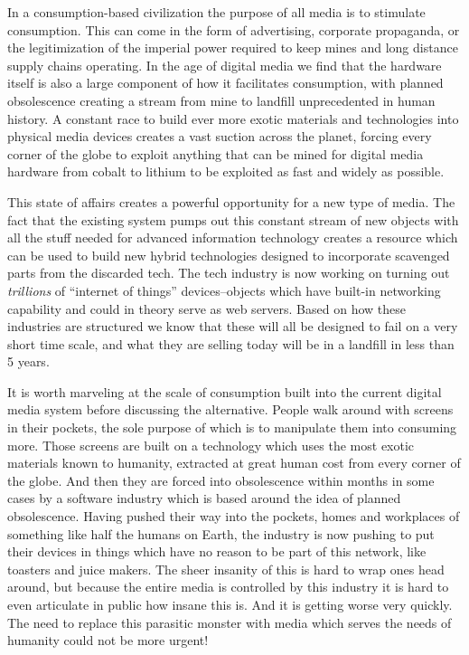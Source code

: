 
In a consumption-based civilization the purpose of all media is to stimulate consumption.  This can come in the form of advertising, corporate propaganda, or the legitimization of the imperial power required to keep mines and long distance supply chains operating.  In the age of digital media we find that the hardware itself is also a large component of how it facilitates consumption, with planned obsolescence creating a stream from mine to landfill unprecedented in human history.  A constant race to build ever more exotic materials and technologies into physical media devices creates a vast suction across the planet, forcing every corner of the globe to exploit anything that can be mined for digital media hardware from cobalt to lithium to be exploited as fast and widely as possible.  

This state of affairs creates a powerful opportunity for a new type of media.  The fact that the existing system pumps out this constant stream of new objects with all the stuff needed for advanced information technology creates a resource which can be used to build new hybrid technologies designed to incorporate scavenged parts from the discarded tech.  The tech industry is now working on turning out \emph{trillions} of ``internet of things'' devices--objects which have built-in networking capability and could in theory serve as web servers.  Based on how these industries are structured we know that these will all be designed to fail on a very short time scale, and what they are selling today will be in a landfill in less than 5 years.  

It is worth marveling at the scale of consumption built into the current digital media system before discussing the alternative.  People walk around with screens in their pockets, the sole purpose of which is to manipulate them into consuming more.  Those screens are built on a technology which uses the most exotic materials known to humanity, extracted at great human cost from every corner of the globe.  And then they are forced into obsolescence within months in some cases by a software industry which is based around the idea of planned obsolescence.   Having pushed their way into the pockets, homes and workplaces of something like half the humans on Earth, the industry is now pushing to put their devices in things which have no reason to be part of this network, like toasters and juice makers.  The sheer insanity of this is hard to wrap ones head around, but because the entire media is controlled by this industry it is hard to even articulate in public how insane this is.  And it is getting worse very quickly.  The need to replace this parasitic monster with media which serves the needs of humanity could not be more urgent!

